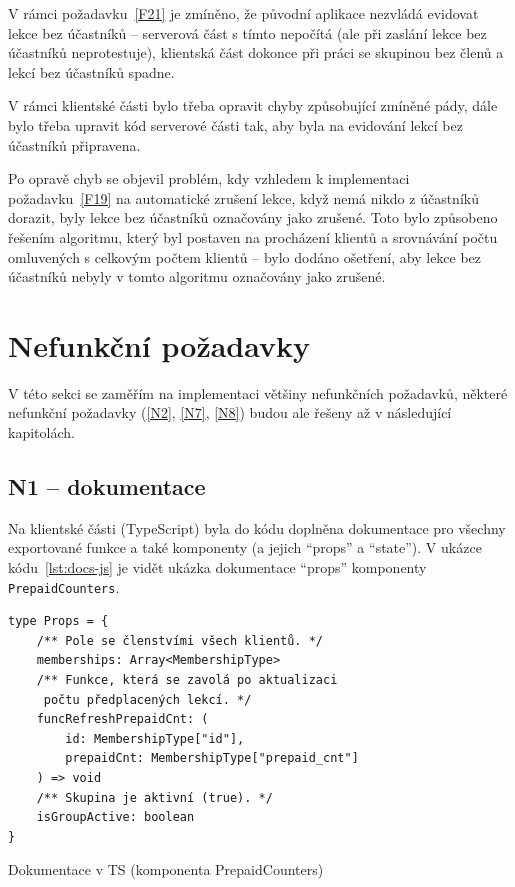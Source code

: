 V rámci požadavku~\ref{F21} je zmíněno, že původní aplikace nezvládá evidovat lekce bez účastníků -- serverová část s tímto nepočítá (ale při zaslání lekce bez účastníků neprotestuje), klientská část dokonce při práci se skupinou bez členů a lekcí bez účastníků spadne.

V rámci klientské části bylo třeba opravit chyby způsobující zmíněné pády, dále bylo třeba upravit kód serverové části tak, aby byla na evidování lekcí bez účastníků připravena.

Po opravě chyb se objevil problém, kdy vzhledem k implementaci požadavku~\ref{F19} na automatické zrušení lekce, když nemá nikdo z účastníků dorazit, byly lekce bez účastníků označovány jako zrušené. Toto bylo způsobeno řešením algoritmu, který byl postaven na procházení klientů a srovnávání počtu omluvených s celkovým počtem klientů -- bylo dodáno ošetření, aby lekce bez účastníků nebyly v tomto algoritmu označovány jako zrušené.

\section{Nefunkční požadavky}

V této sekci se zaměřím na implementaci většiny nefunkčních požadavků, některé nefunkční požadavky (\ref{N2}, \ref{N7}, \ref{N8}) budou ale řešeny až v následující kapitolách.

\subsection{N1 -- dokumentace}

Na klientské části (TypeScript) byla do kódu doplněna dokumentace pro všechny exportované funkce a také komponenty (a jejich \enquote{props} a \enquote{state}). V ukázce kódu~\ref{lst:docs-js} je vidět ukázka dokumentace \enquote{props} komponenty \verb|PrepaidCounters|.

\begin{listing}[ht]
	\begin{verbatim}
type Props = {
    /** Pole se členstvími všech klientů. */
    memberships: Array<MembershipType>
    /** Funkce, která se zavolá po aktualizaci
     počtu předplacených lekcí. */
    funcRefreshPrepaidCnt: (
        id: MembershipType["id"],
        prepaidCnt: MembershipType["prepaid_cnt"]
    ) => void
    /** Skupina je aktivní (true). */
    isGroupActive: boolean
}
	\end{verbatim}
	\caption{Dokumentace v TS (komponenta PrepaidCounters)}\label{lst:docs-js}
\end{listing}

